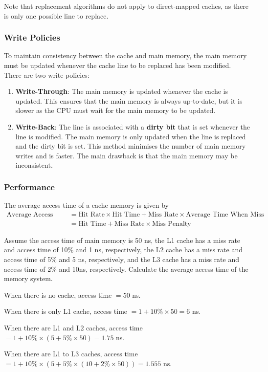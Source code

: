 Note that replacement algorithms do not apply to direct-mapped caches, as there is only
one possible line to replace.

\subsubsection{Write Policies}

To maintain consistency between the cache and main memory, the main memory must be updated
whenever the cache line to be replaced has been modified. There are two write policies:
\begin{enumerate}
\item \textbf{Write-Through}:
    The main memory is updated whenever the cache is updated. This ensures that the main
    memory is always up-to-date, but it is slower as the CPU must wait for the main memory
    to be updated.

\item \textbf{Write-Back}:
    The line is associated with a \textbf{dirty bit} that is set whenever the line is
    modified. The main memory is only updated when the line is replaced and the dirty bit
    is set. This method minimises the number of main memory writes and is faster.
    The main drawback is that the main memory may be inconsistent.
\end{enumerate}

\subsubsection{Performance}

\begin{definition}
    The average access time of a cache memory is given by
    \begin{align*}
        \text{Average Access Time}
        &= \text{Hit Rate} \times \text{Hit Time} + \text{Miss Rate} \times \text{Average Time When Miss} \\
        &= \text{Hit Time} + \text{Miss Rate} \times \text{Miss Penalty}
    \end{align*}
\end{definition}

\begin{example}
    Assume the access time of main memory is 50 ns, the L1 cache has a miss rate and access
    time of 10\% and 1 ns, respectively, the L2 cache has a miss rate and access time
    of 5\% and 5 ns, respectively, and the L3 cache has a miss rate and access time of 2\%
    and 10ns, respectively. Calculate the average access time of the memory system.

    \begin{solution}
        When there is no cache, access time $=50$ ns.

        When there is only L1 cache, access time $=1+10\%\times 50=6$ ns.

        When there are L1 and L2 caches, access time $=1+10\%\times(5+5\%\times 50)=1.75$ ns.

        When there are L1 to L3 caches, access time $=1+10\%\times(5+5\%\times(10+2\%\times 50))=\boxed{1.555\text{ ns}}$.
    \end{solution}
\end{example}

